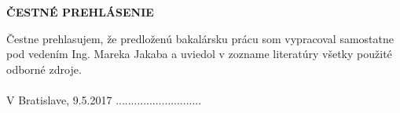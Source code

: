 
\newpage
\thispagestyle{plain}
\vspace*{13cm} 
\begin{large}
\noindent
\textbf{ČESTNÉ PREHLÁSENIE} \\
\end{large}
\noindent
Čestne prehlasujem, že predloženú bakalársku prácu som vypracoval samostatne pod vedením
Ing. Mareka Jakaba a uviedol v zozname literatúry všetky použité odborné zdroje.\\
\vspace*{0.5cm}\\
V Bratislave, 9.5.2017
\hspace*{7cm}............................\\
\hspace*{10.8cm} \Author